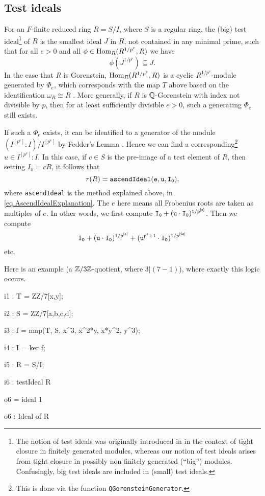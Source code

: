 \documentclass{amsart}
\begin{document}
\subsection{Test ideals}

For an $F$-finite reduced ring $R = S/I$, where $S$ is a regular ring, the (big) test ideal\footnote{The notion of test ideals was originally introduced in \cite{HochsterHunekeTC1} in the context of tight closure in finitely generated modules, whereas our notion of test ideals arises from
tight closure in possibly non finitely generated (``big'') modules. Confusingly, big test ideals are included in (small) test ideals.}
of $R$ is the smallest ideal $J$ in $R$, not contained in any minimal prime, such that for all $e > 0$ and all $\phi \in \operatorname{Hom}_R(R^{1/p^e}, R)$ we have
\[ \phi(J^{1/p^e}) \subseteq J.\]
In the case that $R$ is Gorenstein,
$\operatorname{Hom}_R(R^{1/p^e}, R)$ is a cyclic $R^{1/p^e}$-module generated by
$\Phi_e$, which corresponds with the map $T$ above based on the identification
$\omega_R \cong R$ \cite{BlickleSchwedeSurveyPMinusE}.  More generally, if $R$ is $\mathbb{Q}$-Gorenstein with index not divisible by $p$, then for at least sufficiently divisible $e > 0$, such a generating $\Phi_e$ still exists.

If such a $\Phi_e$ exists, it can be identified to a generator of the module $(I^{[p^e]} : I) / I^{[p^e]}$ by Fedder's Lemma \cite{FedderFPureRat}.  Hence we can find a corresponding\footnote{This is done via the function \texttt{QGorensteinGenerator}. } $u \in I^{[p^e]} : I$.  In this case, if $c \in S$ is the pre-image of a test element of $R$, then setting $I_0 = cR$, it follows that
\[
\tau(R) = {\tt ascendIdeal(e, u, I_0)},
\]
where \texttt{ascendIdeal} is the method explained above, in \autoref{eq.AscendIdealExplanation}.
The $e$ here means all Frobenius roots are taken as multiples of $e$.  In other words, we first compute ${\tt I_0 +  (u \cdot I_0)^{1/p^{[e]}}}$.  Then we compute
\[
{\tt I_0 +  (u\cdot I_0)^{1/p^{[e]}} + (u^{p^e + 1} \cdot I_0)^{1/p^{[2e]}} }
\]
etc.
%
%

Here is an example (a $\mathbb{Z}/3\mathbb{Z}$-quotient, where $3 | (7-1)$), where exactly this logic occurs.

\medskip
{\small{}
\begin{MyVerbatim}
i1 : T = ZZ/7[x,y];

i2 : S = ZZ/7[a,b,c,d];

i3 : f = map(T, S, {x^3, x^2*y, x*y^2, y^3});

i4 : I = ker f;

i5 : R = S/I;

i6 : testIdeal R

o6 = ideal 1

o6 : Ideal of R
\end{MyVerbatim}
}\medskip
\end{document}
